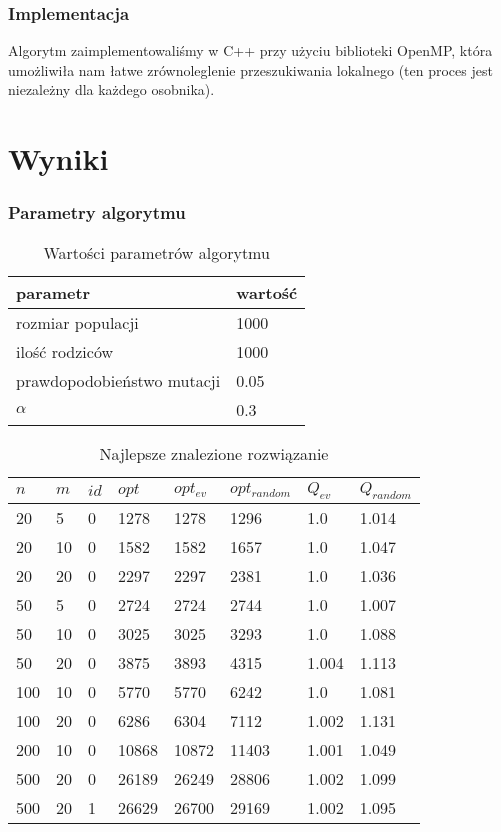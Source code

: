 \documentclass[10pt]{beamer}
\begin{document}
\frame
{
\frametitle{Implementacja}
Algorytm zaimplementowaliśmy w C++ przy użyciu biblioteki OpenMP, która umożliwiła nam łatwe zrównoleglenie
przeszukiwania lokalnego (ten proces jest niezależny dla każdego osobnika).

}

\section{Wyniki}

\frame
{

\frametitle{Parametry algorytmu}

\begin{table}[H]
\caption{Wartości parametrów algorytmu}
\label{parametry}
\begin{center}
\begin{tabular}{|l|l|}
  \hline
  parametr & wartość \\
  \hline
  rozmiar populacji & 1000 \\
  ilość rodziców & 1000 \\
  prawdopodobieństwo mutacji & 0.05 \\
  $\alpha$ & 0.3 \\
  \hline
\end{tabular}
\end{center}
\end{table}

}



\frame
{
\begin{table}[H]
\caption{Najlepsze znalezione rozwiązanie}
\label{best}
\begin{center}
\begin{tabular}{|l|l|l|l||l|l||l|l|}
  \hline
  $n$ & $m$ & $id$ & $opt$ & $opt_{ev}$ & $opt_{random}$ & $Q_{ev}$ & $Q_{random}$ \\
  \hline
  20 & 5 & 0 & 1278 & 1278 & 1296 & 1.0 & 1.014 \\
  20 & 10 & 0 & 1582 & 1582 & 1657 & 1.0 & 1.047 \\
  20 & 20 & 0 & 2297 & 2297 & 2381 & 1.0 & 1.036 \\
  50 & 5 & 0 & 2724 & 2724 & 2744 & 1.0 & 1.007 \\
  50 & 10 & 0 & 3025 & 3025 & 3293 & 1.0 & 1.088 \\
  50 & 20 & 0 & 3875 & 3893 & 4315 & 1.004 & 1.113 \\
  100 & 10 & 0 & 5770 & 5770 & 6242 & 1.0 & 1.081 \\
  100 & 20 & 0 & 6286 & 6304 & 7112 & 1.002 & 1.131 \\
  200 & 10 & 0 & 10868 & 10872 & 11403 & 1.001 & 1.049 \\
  500 & 20 & 0 & 26189 & 26249 & 28806 & 1.002 & 1.099 \\
  500 & 20 & 1 & 26629 & 26700 & 29169 & 1.002 & 1.095 \\
  \hline
\end{tabular}
\end{center}
\end{table}


}
\end{document}
